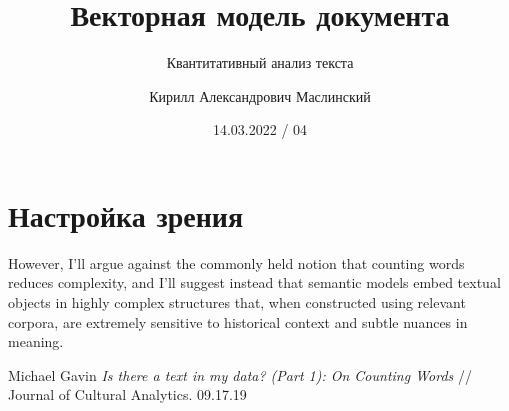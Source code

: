 \documentclass[svgnames]{beamer}
\title[CMTA 04] %
{Векторная модель документа}
\subtitle
{Квантитативный анализ текста} %
\author%
{Кирилл Александрович Маслинский}
\institute%
{ЕУ СПб}
\date%
{14.03.2022 / 04}
\begin{document}
\begin{frame}
  \titlepage
\end{frame}

\section{Настройка зрения}


\begin{frame}
  \begin{block}{}
    However, I'll argue against the commonly held notion that counting
    words reduces complexity, and I'll suggest instead that semantic
    models embed textual objects in highly complex structures that,
    when constructed using relevant corpora, are extremely sensitive
    to historical context and subtle nuances in meaning.
  \end{block}
  
Michael Gavin \textit{Is there a text in my data? (Part 1): On
Counting Words} // Journal of Cultural Analytics. 09.17.19 
\end{frame}
\end{document}
